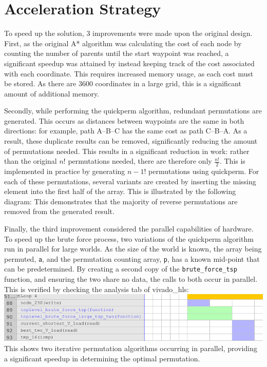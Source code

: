 \documentclass[a4paper, 11pt]{article}
\begin{document}
\section{Acceleration Strategy} %
To speed up the solution, 3 improvements were made upon the original design. 
First, as the original A* algorithm was calculating the cost of each node by 
counting the number of parents until the start waypoint was reached, a significant 
speedup was attained by instead keeping track of the cost associated with each 
coordinate. This requires increased memory usage, as each cost must 
be stored. As there are 3600 coordinates in a large grid, this is a significant 
amount of additional memory. 
\par\bigskip\noindent
Secondly, while performing the quickperm algorithm, redundant permutations are
generated. This occurs as distances between waypoints are the same in both directions: 
for example, path A--B--C has the same cost as path C--B--A. As a result, these 
duplicate results can be removed, significantly reducing the amount of permutations 
needed. This results in a significant reduction in work: rather than the original 
$n!$ permutations needed, there are therefore only
$\frac{n!}{2}$. 
This is implemented in practice by generating $n-1!$ permutations using
quickperm. For each of these permutations, several variants are created by 
inserting the missing element into the first half of the array. 
This is illustrated by the following diagram: 
This demonstrates that the majority of reverse permutations are removed from the
generated result. 
\par\bigskip\noindent
Finally, the third improvement considered the parallel capabilities 
of hardware. To speed up the brute force process, 
two variations of the quickperm algorithm run in parallel for large worlds. 
As the size of the world is known, the array being 
permuted, \texttt{a}, and the permutation counting array, \texttt{p}, has a known 
mid-point that can be predetermined. By creating a second copy of the 
\texttt{brute\_force\_tsp} function, and ensuring the two share no data, the calls 
to both occur in parallel. This is verified by checking the analysis tab of 
vivado\_hls:  \\
\includegraphics[width=\textwidth]{vivado_hls}
This shows two iterative permutation algorithms occurring in parallel, providing 
a significant speedup in determining the optimal permutation. 
\end{document}
